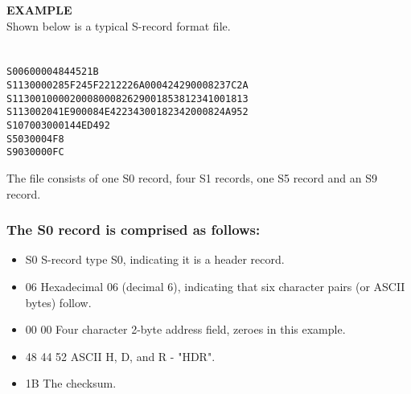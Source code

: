                \textbf{EXAMPLE}\\
                Shown below is a typical S-record format file.
                    {
                        ~\\
                        \usecodefont\\
                        \verb''\\
                        \verb'S00600004844521B'\\
                        \verb'S1130000285F245F2212226A000424290008237C2A'\\
                        \verb'S11300100002000800082629001853812341001813'\\
                        \verb'S113002041E900084E42234300182342000824A952'\\
                        \verb'S107003000144ED492'\\
                        \verb'S5030004F8'\\
                        \verb'S9030000FC'\\
                    }

                The file consists of one S0 record, four S1 records, one S5 record and
                an S9 record.

                \subsubsection{The S0 record is comprised as follows:}
                    \begin{itemize}
                        \item S0 S-record type S0, indicating it is a header record.
                        \item 06 Hexadecimal 06 (decimal 6), indicating that six character pairs (or ASCII bytes) follow.
                        \item 00 00 Four character 2-byte address field, zeroes in this example.
                        \item 48 44 52 ASCII H, D, and R - "HDR".
                        \item 1B The checksum.
                    \end{itemize}

